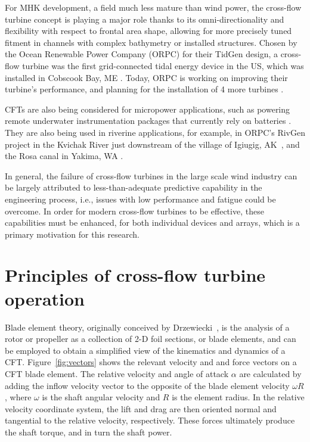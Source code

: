 For MHK development, a field much less mature than wind power, the cross-flow
turbine concept is playing a major role thanks to its omni-directionality and
flexibility with respect to frontal area shape, allowing for more precisely
tuned fitment in channels with complex bathymetry or installed structures.
Chosen by the Ocean Renewable Power Company (ORPC) for their TidGen design, a
cross-flow turbine was the first grid-connected tidal energy device in the US,
which was installed in Cobscook Bay, ME \cite{ORPC2012}. Today, ORPC is working
on improving their turbine's performance, and planning for the installation of 4
more turbines \cite{Nelson2013}. 

CFTs are also being considered for micropower applications, such as powering
remote underwater instrumentation packages that currently rely on batteries
\cite{Polagye2013b}. They are also being used in riverine applications, for
example, in ORPC's RivGen project in the Kvichak River just downstream of the
village of Igiugig, AK~\cite{Forbush2015}, and the Rosa canal in Yakima, WA
\cite{Gunawan2014}. 

In general, the failure of cross-flow turbines in the large scale wind industry
can be largely attributed to less-than-adequate predictive capability in the
engineering process, i.e., issues with low performance and fatigue could be
overcome. In order for modern cross-flow turbines to be effective, these
capabilities must be enhanced, for both individual devices and arrays, which is
a primary motivation for this research.


\section{Principles of cross-flow turbine operation}

Blade element theory, originally conceived by
Drzewiecki~\cite{Drzewiecki1892,Drzewiecki1920}, is the analysis of a rotor or
propeller as a collection of 2-D foil sections, or blade elements, and can be
employed to obtain a simplified view of the kinematics and dynamics of a CFT.
Figure~\ref{fig:vectors} shows the relevant velocity and and force vectors on a
CFT blade element. The relative velocity and angle of attack $\alpha$ are
calculated by adding the inflow velocity vector to the opposite of the blade
element velocity $\omega R$, where $\omega$ is the shaft angular velocity and
$R$ is the element radius. In the relative velocity coordinate system, the lift
and drag are then oriented normal and tangential to the relative velocity,
respectively. These forces ultimately produce the shaft torque, and in turn the
shaft power.

